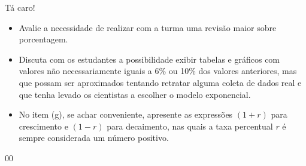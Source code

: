 \begin{sugestions}{Tá caro!}
{
	\begin{itemize}
	\item Avalie a necessidade de realizar com a turma uma revisão maior sobre porcentagem.
	\end{itemize}


	\begin{itemize}
	\item Discuta com os estudantes a possibilidade exibir tabelas e gráficos com valores não necessariamente iguais a 6\% ou 10\% dos valores anteriores, mas que possam ser aproximados tentando retratar alguma coleta de dados real e que tenha levado os cientistas a escolher o modelo exponencial.
	\item No item (g), se achar conveniente, apresente as expressões $(1+r)$ para crescimento e $(1-r)$ para decaimento, nas quais a taxa percentual $r$ é sempre considerada um número positivo.
	\end{itemize}
}{0}{0}
\end{sugestions}
